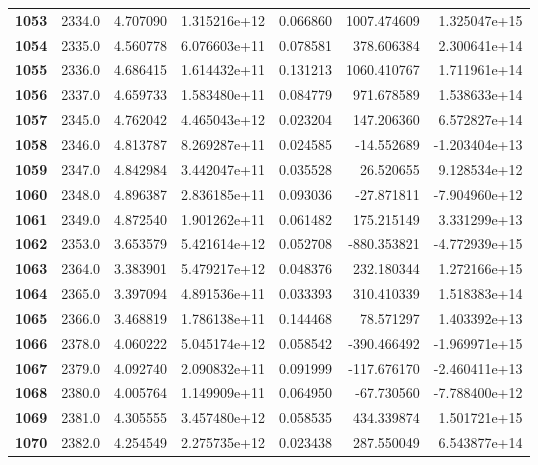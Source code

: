 \documentclass{report}[12pt]
\begin{document}
\begin{center}
\begin{tabular}{lrrrrrr}
\textbf{1053} &         2334.0 &   4.707090 &  1.315216e+12 &    0.066860 &  1007.474609 &  1.325047e+15 \\
\textbf{1054} &         2335.0 &   4.560778 &  6.076603e+11 &    0.078581 &   378.606384 &  2.300641e+14 \\
\textbf{1055} &         2336.0 &   4.686415 &  1.614432e+11 &    0.131213 &  1060.410767 &  1.711961e+14 \\
\textbf{1056} &         2337.0 &   4.659733 &  1.583480e+11 &    0.084779 &   971.678589 &  1.538633e+14 \\
\textbf{1057} &         2345.0 &   4.762042 &  4.465043e+12 &    0.023204 &   147.206360 &  6.572827e+14 \\
\textbf{1058} &         2346.0 &   4.813787 &  8.269287e+11 &    0.024585 &   -14.552689 & -1.203404e+13 \\
\textbf{1059} &         2347.0 &   4.842984 &  3.442047e+11 &    0.035528 &    26.520655 &  9.128534e+12 \\
\textbf{1060} &         2348.0 &   4.896387 &  2.836185e+11 &    0.093036 &   -27.871811 & -7.904960e+12 \\
\textbf{1061} &         2349.0 &   4.872540 &  1.901262e+11 &    0.061482 &   175.215149 &  3.331299e+13 \\
\textbf{1062} &         2353.0 &   3.653579 &  5.421614e+12 &    0.052708 &  -880.353821 & -4.772939e+15 \\
\textbf{1063} &         2364.0 &   3.383901 &  5.479217e+12 &    0.048376 &   232.180344 &  1.272166e+15 \\
\textbf{1064} &         2365.0 &   3.397094 &  4.891536e+11 &    0.033393 &   310.410339 &  1.518383e+14 \\
\textbf{1065} &         2366.0 &   3.468819 &  1.786138e+11 &    0.144468 &    78.571297 &  1.403392e+13 \\
\textbf{1066} &         2378.0 &   4.060222 &  5.045174e+12 &    0.058542 &  -390.466492 & -1.969971e+15 \\
\textbf{1067} &         2379.0 &   4.092740 &  2.090832e+11 &    0.091999 &  -117.676170 & -2.460411e+13 \\
\textbf{1068} &         2380.0 &   4.005764 &  1.149909e+11 &    0.064950 &   -67.730560 & -7.788400e+12 \\
\textbf{1069} &         2381.0 &   4.305555 &  3.457480e+12 &    0.058535 &   434.339874 &  1.501721e+15 \\
\textbf{1070} &         2382.0 &   4.254549 &  2.275735e+12 &    0.023438 &   287.550049 &  6.543877e+14 \\

\end{tabular}
\end{center}
\end{document}

